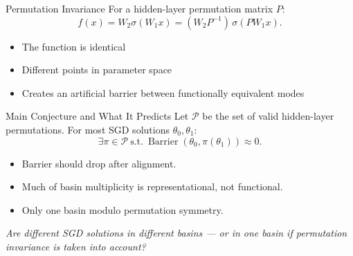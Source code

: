 \documentclass[aspectratio=169,11pt]{beamer}
\begin{document}
\begin{frame}{Permutation Invariance}
  For a hidden-layer permutation matrix $P$:
  \[
    f(x)=W_2\sigma(W_1x)=(W_2P^{-1})\,\sigma(PW_1x).
  \]
  \vspace{0.25cm}

  \begin{itemize}
    \item The function is identical
    \item Different points in parameter space
    \item Creates an artificial barrier between functionally equivalent modes
  \end{itemize}
\end{frame}

\begin{frame}{Main Conjecture and What It Predicts}
  Let $\mathcal{P}$ be the set of valid hidden-layer permutations. For most SGD solutions $\theta_0,\theta_1$:
  \[
    \exists \pi\in\mathcal{P}\ \text{s.t.}\ 
    \operatorname{Barrier}\!\left(\theta_0,\pi(\theta_1)\right)\approx 0.
  \]
  \vspace{0.15cm}
  \begin{itemize}
    \item Barrier should drop after alignment.
    \item Much of basin multiplicity is representational, not functional.
    \item Only one basin modulo permutation symmetry.
  \end{itemize}
  \vfill
  \begin{center}
    {\large\textit{Are different SGD solutions in different basins --- or in one basin if permutation invariance is taken into account?}}
  \end{center}
\end{frame}
\end{document}
